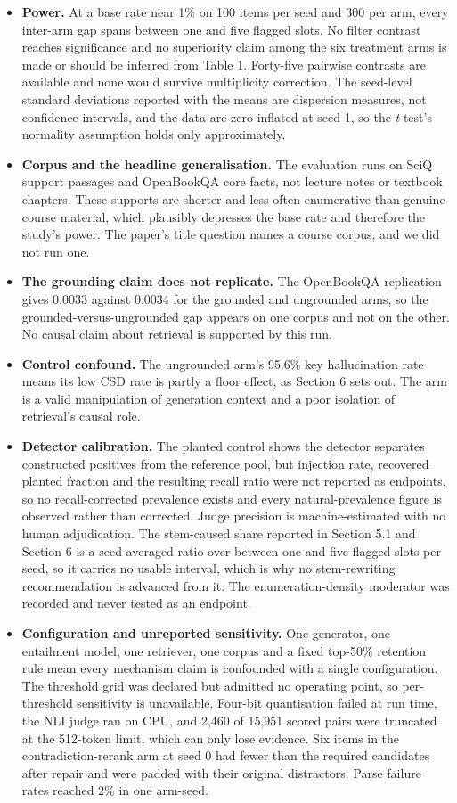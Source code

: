 \documentclass[11pt]{article}
\begin{document}
\begin{itemize}
\item \textbf{Power.} At a base rate near 1\% on 100 items per seed and 300 per arm, every inter-arm gap spans between one and five flagged slots. No filter contrast reaches significance and no superiority claim among the six treatment arms is made or should be inferred from Table 1. Forty-five pairwise contrasts are available and none would survive multiplicity correction. The seed-level standard deviations reported with the means are dispersion measures, not confidence intervals, and the data are zero-inflated at seed 1, so the \emph{t}-test's normality assumption holds only approximately.
\item \textbf{Corpus and the headline generalisation.} The evaluation runs on SciQ support passages and OpenBookQA core facts, not lecture notes or textbook chapters. These supports are shorter and less often enumerative than genuine course material, which plausibly depresses the base rate and therefore the study's power. The paper's title question names a course corpus, and we did not run one.
\item \textbf{The grounding claim does not replicate.} The OpenBookQA replication gives 0.0033 against 0.0034 for the grounded and ungrounded arms, so the grounded-versus-ungrounded gap appears on one corpus and not on the other. No causal claim about retrieval is supported by this run.
\item \textbf{Control confound.} The ungrounded arm's 95.6\% key hallucination rate means its low CSD rate is partly a floor effect, as Section 6 sets out. The arm is a valid manipulation of generation context and a poor isolation of retrieval's causal role.
\item \textbf{Detector calibration.} The planted control shows the detector separates constructed positives from the reference pool, but injection rate, recovered planted fraction and the resulting recall ratio were not reported as endpoints, so no recall-corrected prevalence exists and every natural-prevalence figure is observed rather than corrected. Judge precision is machine-estimated with no human adjudication. The stem-caused share reported in Section 5.1 and Section 6 is a seed-averaged ratio over between one and five flagged slots per seed, so it carries no usable interval, which is why no stem-rewriting recommendation is advanced from it. The enumeration-density moderator was recorded and never tested as an endpoint.
\item \textbf{Configuration and unreported sensitivity.} One generator, one entailment model, one retriever, one corpus and a fixed top-50\% retention rule mean every mechanism claim is confounded with a single configuration. The threshold grid was declared but admitted no operating point, so per-threshold sensitivity is unavailable. Four-bit quantisation failed at run time, the NLI judge ran on CPU, and 2,460 of 15,951 scored pairs were truncated at the 512-token limit, which can only lose evidence. Six items in the contradiction-rerank arm at seed 0 had fewer than the required candidates after repair and were padded with their original distractors. Parse failure rates reached 2\% in one arm-seed.

\end{itemize}
\end{document}
